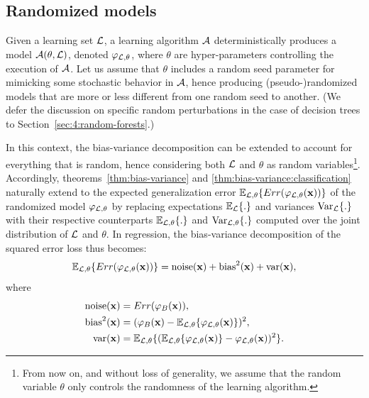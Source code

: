 \subsection{Randomized models}

Given a learning set ${\cal L}$, a learning algorithm ${\cal A}$
deterministically produces a model ${\cal A}(\theta, {\cal L})$, denoted
$\varphi_{{\cal L},\theta}$, where $\theta$ are hyper-parameters controlling
the execution of ${\cal A}$. Let us assume that $\theta$ includes a random seed
parameter for mimicking some stochastic behavior in ${\cal A}$, hence producing
(pseudo-)randomized models that are more or less different from one random seed
to another. (We defer the discussion on specific random perturbations in the
case of decision trees to Section~\ref{sec:4:random-forests}.)

In this context, the bias-variance decomposition can be extended to account for
everything that is random, hence considering both ${\cal L}$ and $\theta$ as
random variables\footnote{From now on, and without loss of generality, we
assume that the random variable $\theta$ only controls the randomness of the
learning algorithm.}.
Accordingly, theorems~\ref{thm:bias-variance} and \ref{thm:bias-variance:classification}
naturally extend to the expected generalization error
$\mathbb{E}_{{\cal L},\theta} \{ Err(\varphi_{{\cal L},\theta}(\mathbf{x})) \}$
of the randomized model $\varphi_{{\cal L},\theta}$ by replacing expectations
$\mathbb{E}_{\cal L} \{ . \}$ and variances $\text{Var}_{\cal L} \{ . \}$ with
their respective counterparts $\mathbb{E}_{{\cal L},\theta} \{ . \}$ and
$\text{Var}_{{\cal L},\theta} \{ . \}$ computed over the joint distribution of
${\cal L}$ and $\theta$. In regression, the bias-variance decomposition
of the squared error loss thus becomes:
\begin{equation}
\mathbb{E}_{{\cal L},\theta} \{ Err(\varphi_{{\cal L},\theta}(\mathbf{x})) \} = \text{noise}(\mathbf{x}) + \text{bias}^2(\mathbf{x}) + \text{var}(\mathbf{x}),
\end{equation}
where
\begin{align}
\text{noise}(\mathbf{x}) &= Err(\varphi_B(\mathbf{x})), \\
\text{bias}^2(\mathbf{x}) &= (\varphi_B(\mathbf{x}) - \mathbb{E}_{{\cal L},\theta} \{ \varphi_{{\cal L},\theta}(\mathbf{x}) \} )^2, \\
\text{var}(\mathbf{x}) &= \mathbb{E}_{{\cal L},\theta} \{ (\mathbb{E}_{{\cal L},\theta} \{ \varphi_{{\cal L},\theta}(\mathbf{x}) \} - \varphi_{{\cal L},\theta}(\mathbf{x}))^2 \}.
\end{align}

